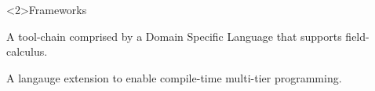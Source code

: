 \begin{frame}<2>{Frameworks}
  \begin{card}
    A tool-chain comprised by a Domain Specific Language that supports field-calculus.
  \end{card}
  \pause
  \begin{card}
    A langauge extension to enable compile-time multi-tier programming.\\
  \end{card}
\end{frame}